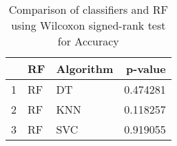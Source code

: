 \begin{table}
\footnotesize
\caption{Comparison of classifiers and RF using Wilcoxon signed-rank test for Accuracy}
\label{tab:RF wilcoxon Accuracy comparison}
\begin{tabular}{lllr}
\hline
 & RF & Algorithm & p-value \\
\hline
1 & RF & DT & 0.474281 \\
2 & RF & KNN & 0.118257 \\
3 & RF & SVC & 0.919055 \\
\hline
\end{tabular}
\end{table}
